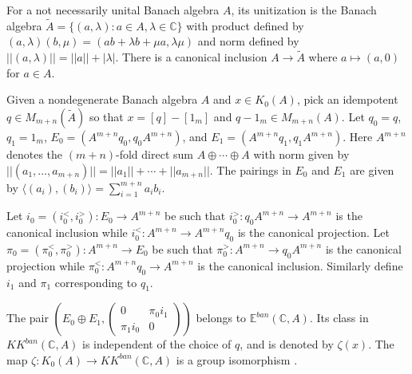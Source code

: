 \documentclass[a4,11pt]{amsart}
\theoremstyle{remark}
\begin{document}


For a not necessarily unital Banach algebra $A$, its unitization is the Banach algebra $\tilde{A}=\{(a,\lambda):a\in A,\lambda\in\mathbb{C}\}$ with product defined by $(a,\lambda)(b,\mu)=(ab+\lambda b+\mu a,\lambda\mu)$ and norm defined by $||(a,\lambda)||=||a||+|\lambda|$. There is a canonical inclusion $A\rightarrow\tilde{A}$ where $a\mapsto(a,0)$ for $a\in A$. 

Given a nondegenerate Banach algebra $A$ and $x\in K_0(A)$, pick an idempotent $q\in M_{m+n}(\tilde{A})$ so that $x=[q]-[1_m]$ and $q-1_m\in M_{m+n}(A)$.
Let $q_0=q$, $q_1=1_m$, $E_0=(A^{m+n}q_0,q_0A^{m+n})$, and $E_1=(A^{m+n}q_1,q_1A^{m+n})$.
Here $A^{m+n}$ denotes the $(m+n)$-fold direct sum $A\oplus\cdots\oplus A$ with norm given by $||(a_1,\ldots,a_{m+n})||=||a_1||+\cdots+||a_{m+n}||$.
The pairings in $E_0$ and $E_1$ are given by $\langle (a_i),(b_i) \rangle=\sum_{i=1}^{m+n}a_ib_i$.

Let $i_0=(i_0^<,i_0^>):E_0\rightarrow A^{m+n}$ be such that $i_0^>:q_0A^{m+n}\rightarrow A^{m+n}$ is the canonical inclusion while $i_0^<:A^{m+n}\rightarrow A^{m+n}q_0$ is the canonical projection.
Let $\pi_0=(\pi_0^<,\pi_0^>):A^{m+n}\rightarrow E_0$ be such that $\pi_0^>:A^{m+n}\rightarrow q_0A^{m+n}$ is the canonical projection while $\pi_0^<:A^{m+n}q_0\rightarrow A^{m+n}$ is the canonical inclusion.
Similarly define $i_1$ and $\pi_1$ corresponding to $q_1$.

The pair $\left(E_0\oplus E_1,\begin{pmatrix} 0 & \pi_0i_1 \\ \pi_1i_0 & 0 \end{pmatrix}\right)$ belongs to $\mathbb{E}^{ban}(\mathbb{C},A)$. 
Its class in $KK^{ban}(\mathbb{C},A)$ is independent of the choice of $q$, and is denoted by $\zeta(x)$.
The map $\zeta:K_0(A)\rightarrow KK^{ban}(\mathbb{C},A)$ is a group isomorphism \cite[Th\'{e}or\`{e}me 1.2.8]{Laf02}.

\end{document}
